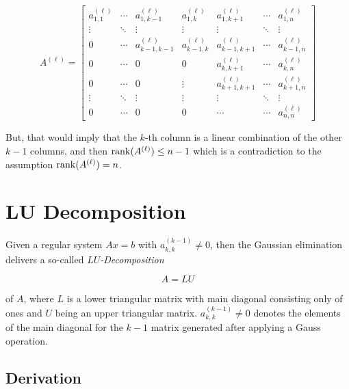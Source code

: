 \[
    A^{(\ell)} =
    \begin{bmatrix}
        a^{(\ell)}_{1,1} & \cdots & a^{(\ell)}_{1,k-1}   & a^{(\ell)}_{1,k}    & a^{(\ell)}_{1,k+1}   & \cdots & a^{(\ell)}_{1,n}    \\
        \vdots          & \ddots & \vdots               & \vdots             & \vdots               & \ddots & \vdots             \\
        0               & \cdots & a^{(\ell)}_{k-1,k-1} & a^{(\ell)}_{k-1,k} & a^{(\ell)}_{k-1,k+1} & \cdots & a^{(\ell)}_{k-1,n} \\
        0               & \cdots & 0                    & 0                  & a^{(\ell)}_{k,k+1}   & \cdots & a^{(\ell)}_{k,n}    \\
        0               & \cdots & 0                    & \vdots             & a^{(\ell)}_{k+1,k+1} & \cdots & a^{(\ell)}_{k+1,n} \\
        \vdots          & \ddots & \vdots               & \vdots             & \vdots               & \ddots & \vdots             \\
        0               & \cdots & 0                    & 0                  & \cdots               & \cdots & a^{(\ell)}_{n,n}
    \end{bmatrix}
\]

But, that would imply that the \(k\)-th column is a linear combination of the other \(k - 1\) columns,
and then \(\mathrm{rank}(A^{(\ell)}) \le n - 1\) which is a contradiction to the assumption \(\mathrm{rank}(A^{(\ell)}) = n\).

\QED

\section{LU Decomposition}

Given a regular system \(Ax = b\) with \(a_{k,k}^{(k - 1)} \ne 0\), then the Gaussian elimination delivers a so-called 
\emph{\(LU\)-Decomposition} 

\[
    A = LU
\]

of \(A\), where \(L\) is a lower triangular matrix with main diagonal consisting only of ones and 
\(U\) being an upper triangular matrix. \(a_{k,k}^{(k - 1)} \ne 0\) denotes the elements of the main diagonal for the 
\(k - 1\) matrix generated after applying a Gauss operation.

\subsection{Derivation}

